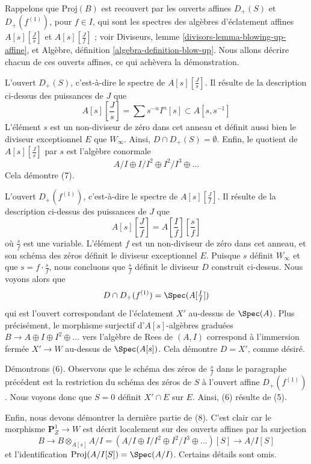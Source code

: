 \medskip\noindent
Rappelons que $\text{Proj}(B)$ est recouvert par les ouverts affines
$D_+(S)$ et $D_+(f^{(1)})$, pour $f \in I$, qui sont
les spectres des algèbres d'éclatement affines $A[s][\frac{J}{s}]$
et $A[s][\frac{J}{f}]$ ; voir
Diviseurs, lemme \ref{divisors-lemma-blowing-up-affine}, et
Algèbre, définition \ref{algebra-definition-blow-up}.
Nous allons décrire chacun de ces ouverts affines, ce qui achèvera la
démonstration.

\medskip\noindent
L'ouvert $D_+(S)$, c'est-à-dire le spectre de $A[s][\frac{J}{s}]$.
Il résulte de la description ci-dessus des puissances de $J$
que
$$
A[s][\textstyle{\frac{J}{s}}] = \sum s^{-n}I^n[s] \subset A[s, s^{-1}]
$$
L'élément $s$ est un non-diviseur de zéro dans cet anneau et définit aussi bien le diviseur
exceptionnel $E$ que $W_\infty$. Ainsi, $D \cap D_+(S) = \emptyset$.
Enfin, le quotient de $A[s][\frac{J}{s}]$ par $s$ est l'algèbre conormale
$$
A/I \oplus I/I^2 \oplus I^2/I^3 \oplus \ldots
$$
Cela démontre (7).

\medskip\noindent
L'ouvert $D_+(f^{(1)})$, c'est-à-dire le spectre de $A[s][\frac{J}{f}]$.
Il résulte de la description ci-dessus des puissances de $J$ que
$$
A[s][\textstyle{\frac{J}{f}}] =
A[\textstyle{\frac{I}{f}}][\textstyle{\frac{s}{f}}]
$$
où $\frac{s}{f}$ est une variable. L'élément $f$ est un non-diviseur de zéro
dans cet anneau, et son schéma des zéros définit le diviseur exceptionnel $E$.
Puisque $s$ définit $W_\infty$ et que $s = f \cdot \frac{s}{f}$,
nous concluons que $\frac{s}{f}$ définit
le diviseur $D$ construit ci-dessus. Nous voyons alors que
$$
D \cap D_+(f^{(1)}) = \Spec(A[\textstyle{\frac{I}{f}}])
$$
qui est l'ouvert correspondant de l'éclatement $X'$ au-dessus de $\Spec(A)$.
Plus précisément, le morphisme surjectif d'$A[s]$-algèbres graduées
$B \to A \oplus I \oplus I^2 \oplus \ldots$
vers l'algèbre de Rees de $(A, I)$ correspond à l'immersion
fermée $X' \to W$ au-dessus de $\Spec(A[s])$.
Cela démontre $D = X'$, comme désiré.

\medskip\noindent
Démontrons (6). Observons que le schéma des zéros de $\frac{s}{f}$
dans le paragraphe précédent est la restriction du schéma des zéros de $S$
à l'ouvert affine $D_+(f^{(1)})$. Nous voyons donc que $S = 0$ définit
$X' \cap E$ sur $E$. Ainsi, (6) résulte de (5).

\medskip\noindent
Enfin, nous devons démontrer la dernière partie de (8). C'est clair
car le morphisme $\mathbf{P}^1_Z \to W$ est décrit localement sur des ouverts affines
par la surjection
$$
B \to B \otimes_{A[s]} A/I =
(A/I \oplus I/I^2 \oplus I^2/I^3 \oplus \ldots)[S] \to
A/I[S]
$$
et l'identification $\text{Proj}(A/I[S]) = \Spec(A/I)$.
Certains détails sont omis.






